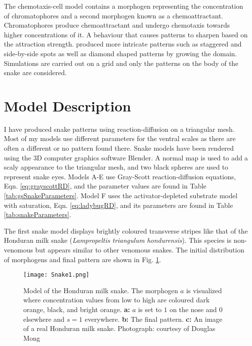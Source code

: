 The chemotaxis-cell model contains a morphogen representing the concentration of chromatophores and a second morphogen known as a chemoattractant. Chromatophores produce chemoattractant and undergo chemotaxis towards higher concentrations of it. A behaviour that causes patterns to sharpen based on the attraction strength. \citet{MURRAY1991} produced more intricate patterns such as staggered and side-by-side spots as well as diamond shaped patterns by growing the domain. Simulations are carried out on a grid and only the patterns on the body of the snake are considered.

\section{Model Description}
I have produced snake patterns using reaction-diffusion on a triangular mesh. Most of my models use different parameters for the ventral scales as there are often a different or no pattern found there. Snake models have been rendered using the 3D computer graphics software Blender. A normal map is used to add a scaly appearance to the triangular mesh, and two black spheres are used to represent snake eyes. Models A-E use Gray-Scott reaction-diffusion equations, Eqn. \ref{eq:grayscottRD}, and the parameter values are found in Table \ref{tab:gsSnakeParameters}. Model F uses the activator-depleted substrate model with saturation, Eqn. \ref{eq:ladybugRD}, and its parameters are found in Table \ref{tab:snakeParameters}.

\newpage
The first snake model displays brightly coloured transverse stripes like that of the Honduran milk snake (\textit{Lampropeltis triangulum hondurensis}). This species is non-venomous but appears similar to other venomous snakes. The initial distribution of morphogens and final pattern are shown in Fig. \ref{fig:Snake1}.

\begin{figure}[ht]
	\centering
	\texttt{[image: Snake1.png]}
	\caption{Model of the Honduran milk snake. The morphogen $a$ is visualized where concentration values from low to high are coloured dark orange, black, and bright orange. \textbf{a:} $a$ is set to $1$ on the nose and $0$ elsewhere and $s=1$ everywhere. \textbf{b:} The final pattern. \textbf{c:} An image of a real Honduran milk snake. \textcolor{citation-gray}{Photograph: courtesy of Douglas Mong}}
	\label{fig:Snake1}
\end{figure}

